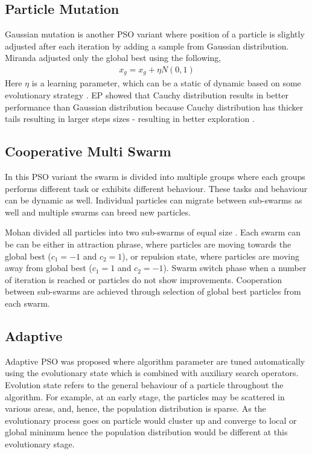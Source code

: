 \documentclass{article}
\begin{document}
\subsection{Particle Mutation}
Gaussian mutation is another PSO variant where position of a particle is slightly adjusted after each iteration by adding a sample from Gaussian distribution. Miranda adjusted only the global best using the following,
\begin{align*}
    x_g  = x_g + \eta N(0, 1)
\end{align*}
Here $\eta$ is a learning parameter, which can be a static of dynamic based on some evolutionary strategy \cite{miranda2002epso}. EP showed that Cauchy distribution results in better performance than Gaussian distribution because Cauchy distribution has thicker tails resulting in larger steps sizes - resulting in better exploration \cite{yao1996fast}.

\subsection{Cooperative Multi Swarm}
In this PSO variant the swarm is divided into multiple groups where each groups performs different task or exhibits different behaviour. These tasks and behaviour can be dynamic as well. Individual particles can migrate between sub-swarms as well and multiple swarms can breed new particles.


Mohan divided all particles into two sub-swarms of equal size  \cite{al2002multi}. Each swarm can be can be either in attraction phrase, where particles are moving towards the global best ($c_1 = -1$ and $c_2 = 1$), or repulsion state, where particles are moving away from global best ($c_1 = 1$ and $c_2 = -1$). Swarm switch phase when a number of iteration is reached or particles do not show improvements. Cooperation between sub-swarms are achieved through selection of global best particles from each swarm.

\subsection{Adaptive}
Adaptive PSO was proposed where algorithm parameter are tuned automatically using the evolutionary state which is combined with auxiliary search operators. Evolution state refers to the general behaviour of a particle throughout the algorithm. For example, at an early stage, the particles may be scattered in various
areas, and, hence, the population distribution is sparse. As the evolutionary process goes on particle would cluster up and converge to local or global minimum hence the population distribution would be different at this evolutionary stage. 
\end{document}
